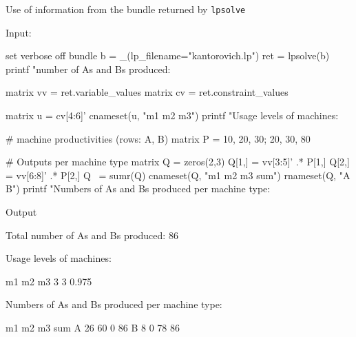 \documentclass{article}
\begin{document}
\begin{script}[htbp]
  \caption{Use of information from the bundle returned by \texttt{lpsolve}}
  \label{ls:kantor-analysis}
Input:
\begin{scode}
set verbose off
bundle b = _(lp_filename="kantorovich.lp")
ret = lpsolve(b)
printf "\nTotal number of As and Bs produced: %

matrix vv = ret.variable_values
matrix cv = ret.constraint_values

matrix u = cv[4:6]'
cnameset(u, "m1 m2 m3")
printf "Usage levels of machines:\n\n%

# machine productivities (rows: A, B)
matrix P = {10, 20, 30; 20, 30, 80}

# Outputs per machine type
matrix Q = zeros(2,3)
Q[1,] = vv[3:5]' .* P[1,]
Q[2,] = vv[6:8]' .* P[2,]
Q ~= sumr(Q)
cnameset(Q, "m1 m2 m3 sum")
rnameset(Q, "A B")
printf "Numbers of As and Bs produced per machine type:\n\n%
\end{scode}
Output
\begin{scode}
Total number of As and Bs produced: 86

Usage levels of machines:

      m1      m2      m3
       3       3   0.975

Numbers of As and Bs produced per machine type:

      m1    m2    m3   sum
A     26    60     0    86
B      8     0    78    86
\end{scode}
\end{script}



\end{document}
